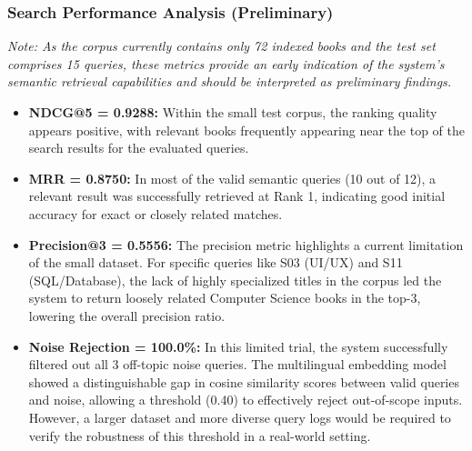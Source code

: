 \subsubsection{Search Performance Analysis (Preliminary)}

\textit{Note: As the corpus currently contains only 72 indexed books and the test set comprises 15 queries, these metrics provide an early indication of the system's semantic retrieval capabilities and should be interpreted as preliminary findings.}

\begin{itemize}
    \item \textbf{NDCG@5 = 0.9288:} Within the small test corpus, the ranking quality appears positive, with relevant books frequently appearing near the top of the search results for the evaluated queries.
    \item \textbf{MRR = 0.8750:} In most of the valid semantic queries (10 out of 12), a relevant result was successfully retrieved at Rank 1, indicating good initial accuracy for exact or closely related matches.
    \item \textbf{Precision@3 = 0.5556:} The precision metric highlights a current limitation of the small dataset. For specific queries like S03 (UI/UX) and S11 (SQL/Database), the lack of highly specialized titles in the corpus led the system to return loosely related Computer Science books in the top-3, lowering the overall precision ratio.
    \item \textbf{Noise Rejection = 100.0\%:} In this limited trial, the system successfully filtered out all 3 off-topic noise queries. The multilingual embedding model showed a distinguishable gap in cosine similarity scores between valid queries and noise, allowing a threshold (0.40) to effectively reject out-of-scope inputs. However, a larger dataset and more diverse query logs would be required to verify the robustness of this threshold in a real-world setting.
\end{itemize}

